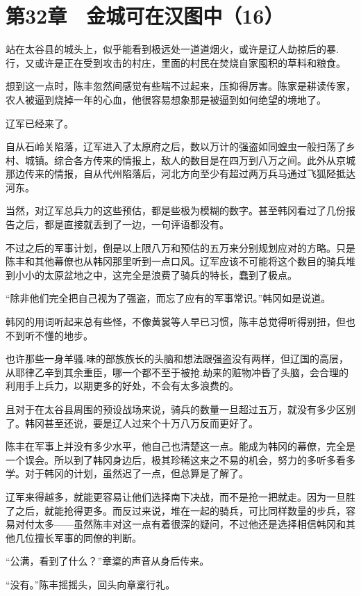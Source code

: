 \section{第32章　金城可在汉图中（16）}

站在太谷县的城头上，似乎能看到极远处一道道烟火，或许是辽人劫掠后的暴.行，又或许是正在受到攻击的村庄，里面的村民在焚烧自家囤积的草料和粮食。

想到这一点时，陈丰忽然间感觉有些喘不过起来，压抑得厉害。陈家是耕读传家，农人被逼到烧掉一年的心血，他很容易想象那是被逼到如何绝望的境地了。

辽军已经来了。

自从石岭关陷落，辽军进入了太原府之后，数以万计的强盗如同蝗虫一般扫荡了乡村、城镇。综合各方传来的情报上，敌人的数目是在四万到八万之间。此外从京城那边传来的情报，自从代州陷落后，河北方向至少有超过两万兵马通过飞狐陉抵达河东。

当然，对辽军总兵力的这些预估，都是些极为模糊的数字。甚至韩冈看过了几份报告之后，都是直接就丢到了一边，一句评语都没有。

不过之后的军事计划，倒是以上限八万和预估的五万来分别规划应对的方略。只是陈丰和其他幕僚也从韩冈那里听到一点口风。辽军应该不可能将这个数目的骑兵堆到小小的太原盆地之中，这完全是浪费了骑兵的特长，蠢到了极点。

“除非他们完全把自己视为了强盗，而忘了应有的军事常识。”韩冈如是说道。

韩冈的用词听起来总有些怪，不像黄裳等人早已习惯，陈丰总觉得听得别扭，但也不到听不懂的地步。

也许那些一身羊骚.味的部族族长的头脑和想法跟强盗没有两样，但辽国的高层，从耶律乙辛到其余重臣，哪一个都不至于被抢.劫来的赃物冲昏了头脑，会合理的利用手上兵力，以期更多的好处，不会有太多浪费的。

且对于在太谷县周围的预设战场来说，骑兵的数量一旦超过五万，就没有多少区别了。韩冈甚至还说，要是辽人过来个十万八万反而更好了。

陈丰在军事上并没有多少水平，他自己也清楚这一点。能成为韩冈的幕僚，完全是一个误会。所以到了韩冈身边后，极其珍稀这来之不易的机会，努力的多听多看多学。对于韩冈的计划，虽然迟了一点，但总算是了解了。

辽军来得越多，就能更容易让他们选择南下决战，而不是抢一把就走。因为一旦胜了之后，就能抢得更多。而反过来说，堆在一起的骑兵，可比同样数量的步兵，容易对付太多——虽然陈丰对这一点有着很深的疑问，不过他还是选择相信韩冈和其他几位擅长军事的同僚的判断。

“公满，看到了什么？”章楶的声音从身后传来。

“没有。”陈丰摇摇头，回头向章楶行礼。


